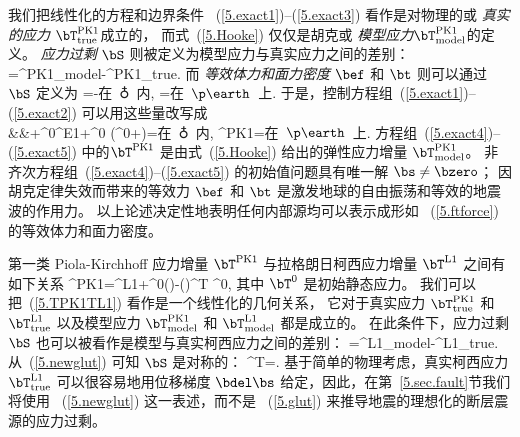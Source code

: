 我们把线性化的方程和边界条件
~(\ref{5.exact1})--(\ref{5.exact3}) 看作是对物理的或 {\em 真实的应力\/}
%
%
$\bT^{\rm PK1}_{\rm true}$成立的，
而式~(\ref{5.Hooke}) 仅仅是胡克或
{\em 模型应力\/}$\bT^{\rm PK1}_{\rm model}$的定义。
%
%
%
%
{\em 应力过剩\/}
%
$\bS$ 则被定义为模型应力与真实应力之间的差别：
\eq
\label{5.glut}
\bS=\bT^{\rm PK1}_{\rm model}-\bT^{\rm PK1}_{\rm true}.
\en
而 {\em 等效体力和面力密度\/}
%
%
%
%
%
%
$\bef$ 和 $\bt$ 则可以通过
$\bS$ 定义为
\eq
\label{5.ftforce}
\bef=-\bdel\cdot\bS\quad\mbox{在 $\earth$ 内},\qquad
\bt=\bnh\cdot\bS\quad\mbox{在 $\p\earth$ 上}.
\en
于是，控制方程组~(\ref{5.exact1})--(\ref{5.exact2})
可以用这些量改写成
\eqa
\label{5.exact4}
 \nonumber \\
&&\mbox{}+\rho^0\bdel\phi^{\rm E1}+\rho^0\bs\cdot
\bdel\bdel(\phi^0+\psi)=\bef\quad\mbox{在 $\earth$ 内},
\ena
\eq
\label{5.exact5}
\bnh\cdot\bT^{\rm PK1}=\bt\quad\mbox{在 $\p\earth$ 上}.
\en
方程组~(\ref{5.exact4})--(\ref{5.exact5}) 中的$\bT^{\rm PK1}$
是由式~(\ref{5.Hooke}) 给出的弹性应力增量
$\bT^{\rm PK1}_{\rm model}$。
非齐次方程组~(\ref{5.exact4})--(\ref{5.exact5})
的初始值问题具有唯一解 $\bs\not=\bzero$；
因胡克定律失效而带来的等效力 $\bef$ 和 $\bt$
是激发地球的自由振荡和等效的地震波的作用力。
以上论述决定性地表明任何内部源均可以表示成形如
~(\ref{5.ftforce})的等效体力和面力密度。

第一类 Piola-Kirchhoff 应力增量 $\bT^{\rm PK1}$ 与拉格朗日柯西应力增量 $\bT^{\rm L1}$ 之间有如下关系
\eq \label{5.TPK1TL1}
\bT^{\rm PK1}=\bT^{\rm L1}+\bT^0(\bdel\cdot\bs)-(\bdel\bs)^{\rm T}
\cdot\bT^0,
\en
其中 $\bT^0$ 是初始静态应力。
我们可以把~(\ref{5.TPK1TL1})
看作是一个线性化的几何关系，
它对于真实应力
$\bT^{\rm PK1}_{\rm true}$ 和 $\bT^{\rm L1}_{\rm true}$ 以及模型应力 $\bT^{\rm PK1}_{\rm model}$ 和 $\bT^{\rm L1}_{\rm model}$ 都是成立的。
在此条件下，应力过剩 $\bS$ 也可以被看作是模型与真实柯西应力之间的差别：
\eq \label{5.newglut}
\bS=\bT^{\rm L1}_{\rm model}-\bT^{\rm L1}_{\rm true}.
\en
从~(\ref{5.newglut}) 可知 $\bS$ 是对称的：
\eq \label{5.glutsymm}
\bS^{\rm T}=\bS.
\en
基于简单的物理考虑，真实柯西应力
$\bT^{\rm L1}_{\rm true}$ 可以很容易地用位移梯度 $\bdel\bs$ 给定，因此，在第~\ref{5.sec.fault}节我们将使用
~(\ref{5.newglut}) 这一表述，而不是
~(\ref{5.glut}) 来推导地震的理想化的断层震源的应力过剩。


